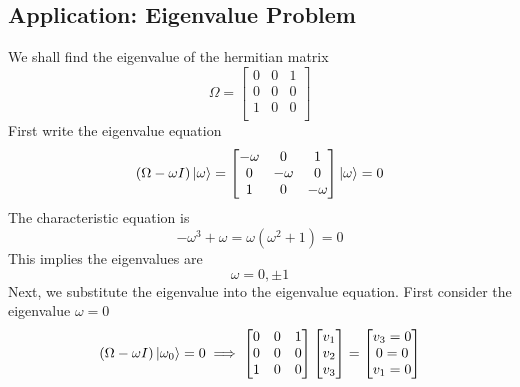 \documentclass[../main.tex]{subfiles}
\begin{document}
\subsection*{Application: Eigenvalue Problem}
We shall find the eigenvalue of the hermitian matrix
\begin{equation*}
    \Omega=\begin{bmatrix}
        0&0&1\\
        0&0&0\\
        1&0&0\\
    \end{bmatrix}
\end{equation*}
First write the eigenvalue equation
\begin{equation*}
    (\Omega-\omega I)\ket{\omega}=
    \begin{bmatrix}
        -\omega&0&1\\
        0&-\omega&0\\
        1&0&-\omega\\
    \end{bmatrix}
    \ket{\omega}=0
\end{equation*}
The characteristic equation is
\begin{equation*}
    -\omega^3+\omega=\omega(\omega^2+1)=0
\end{equation*}
This implies the eigenvalues are
\begin{equation*}
    \omega=0,\pm 1
\end{equation*}
Next, we substitute the eigenvalue into the eigenvalue equation.
First consider the eigenvalue $\omega=0$
\begin{equation*}
    (\Omega-\omega I)\ket{\omega_0}=0\implies
    \begin{bmatrix}
        0&0&1\\
        0&0&0\\
        1&0&0\\
    \end{bmatrix}
    \begin{bmatrix}
        v_1\\
        v_2\\
        v_3\\
    \end{bmatrix}
    =
    \begin{bmatrix}
        v_3=0\\
        0=0\\
        v_1=0
    \end{bmatrix}
\end{equation*}
\end{document}
